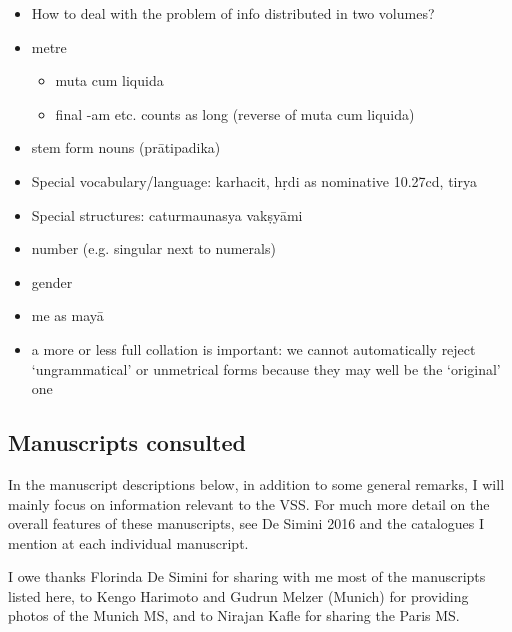 \documentclass[11pt]{article}
\begin{document}
\begin{itemize}
\item How to deal with the problem of info distributed in two volumes?
\item metre
\begin{itemize}
\item muta cum liquida
\item final -am etc. counts as long (reverse of muta cum liquida)
\end{itemize}
\item stem form nouns (prātipadika)
\item Special vocabulary/language: 
karhacit, hṛdi as nominative 10.27cd, tirya
\item Special structures:
caturmaunasya vakṣyāmi
\item number (e.g. singular next to numerals)
\item gender
\item me as mayā
\item a more or less full collation is important: we cannot automatically 
reject `ungrammatical' or unmetrical forms because they may well be the
`original' one
\end{itemize}
\subsection{Manuscripts consulted}
\label{sec:org81773e7}
In the manuscript descriptions below, in addition to some general remarks,
I will mainly focus on information relevant to the VSS. For much more
detail on the overall features of these manuscripts, see De Simini 2016 
and the catalogues I mention at each individual manuscript.

I owe thanks Florinda De Simini for sharing with me most of the manuscripts
listed here, to Kengo Harimoto and Gudrun Melzer (Munich) for providing
photos of the Munich MS, and to Nirajan Kafle for sharing the Paris MS. 
\end{document}
